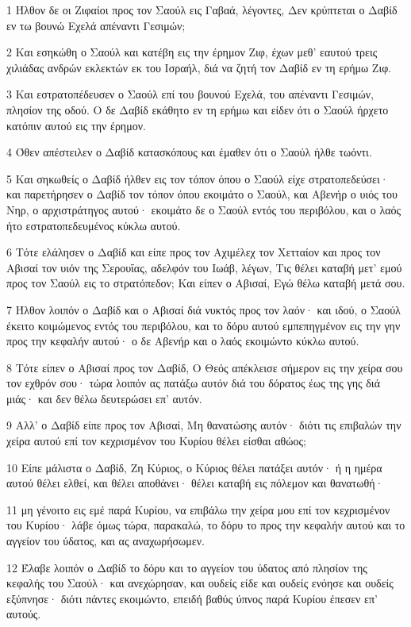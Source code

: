\par 1 Ήλθον δε οι Ζιφαίοι προς τον Σαούλ εις Γαβαά, λέγοντες, Δεν κρύπτεται ο Δαβίδ εν τω βουνώ Εχελά απέναντι Γεσιμών;
\par 2 Και εσηκώθη ο Σαούλ και κατέβη εις την έρημον Ζιφ, έχων μεθ' εαυτού τρεις χιλιάδας ανδρών εκλεκτών εκ του Ισραήλ, διά να ζητή τον Δαβίδ εν τη ερήμω Ζιφ.
\par 3 Και εστρατοπέδευσεν ο Σαούλ επί του βουνού Εχελά, του απέναντι Γεσιμών, πλησίον της οδού. Ο δε Δαβίδ εκάθητο εν τη ερήμω και είδεν ότι ο Σαούλ ήρχετο κατόπιν αυτού εις την έρημον.
\par 4 Όθεν απέστειλεν ο Δαβίδ κατασκόπους και έμαθεν ότι ο Σαούλ ήλθε τωόντι.
\par 5 Και σηκωθείς ο Δαβίδ ήλθεν εις τον τόπον όπου ο Σαούλ είχε στρατοπεδεύσει· και παρετήρησεν ο Δαβίδ τον τόπον όπου εκοιμάτο ο Σαούλ, και Αβενήρ ο υιός του Νηρ, ο αρχιστράτηγος αυτού· εκοιμάτο δε ο Σαούλ εντός του περιβόλου, και ο λαός ήτο εστρατοπεδευμένος κύκλω αυτού.
\par 6 Τότε ελάλησεν ο Δαβίδ και είπε προς τον Αχιμέλεχ τον Χετταίον και προς τον Αβισαί τον υιόν της Σερουΐας, αδελφόν του Ιωάβ, λέγων, Τις θέλει καταβή μετ' εμού προς τον Σαούλ εις το στρατόπεδον; Και είπεν ο Αβισαί, Εγώ θέλω καταβή μετά σου.
\par 7 Ήλθον λοιπόν ο Δαβίδ και ο Αβισαί διά νυκτός προς τον λαόν· και ιδού, ο Σαούλ έκειτο κοιμώμενος εντός του περιβόλου, και το δόρυ αυτού εμπεπηγμένον εις την γην προς την κεφαλήν αυτού· ο δε Αβενήρ και ο λαός εκοιμώντο κύκλω αυτού.
\par 8 Τότε είπεν ο Αβισαί προς τον Δαβίδ, Ο Θεός απέκλεισε σήμερον εις την χείρα σου τον εχθρόν σου· τώρα λοιπόν ας πατάξω αυτόν διά του δόρατος έως της γης διά μιάς· και δεν θέλω δευτερώσει επ' αυτόν.
\par 9 Αλλ' ο Δαβίδ είπε προς τον Αβισαί, Μη θανατώσης αυτόν· διότι τις επιβαλών την χείρα αυτού επί τον κεχρισμένον του Κυρίου θέλει είσθαι αθώος;
\par 10 Είπε μάλιστα ο Δαβίδ, Ζη Κύριος, ο Κύριος θέλει πατάξει αυτόν· ή η ημέρα αυτού θέλει ελθεί, και θέλει αποθάνει· θέλει καταβή εις πόλεμον και θανατωθή·
\par 11 μη γένοιτο εις εμέ παρά Κυρίου, να επιβάλω την χείρα μου επί τον κεχρισμένον του Κυρίου· λάβε όμως τώρα, παρακαλώ, το δόρυ το προς την κεφαλήν αυτού και το αγγείον του ύδατος, και ας αναχωρήσωμεν.
\par 12 Έλαβε λοιπόν ο Δαβίδ το δόρυ και το αγγείον του ύδατος από πλησίον της κεφαλής του Σαούλ· και ανεχώρησαν, και ουδείς είδε και ουδείς ενόησε και ουδείς εξύπνησε· διότι πάντες εκοιμώντο, επειδή βαθύς ύπνος παρά Κυρίου έπεσεν επ' αυτούς.
